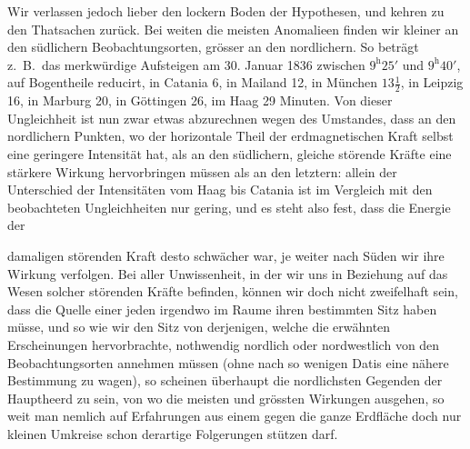 Wir verlassen jedoch lieber den lockern Boden der Hypothesen, und kehren zu den Thatsachen zurück. Bei weiten die meisten Anomalieen finden wir kleiner an den südlichern Beobachtungsorten, grösser an den nordlichern. So beträgt z.\ B.\ das merkwürdige Aufsteigen am 30. Januar 1836 zwischen $9^{\mathrm h}25'$ und $9^{\mathrm h}40'$, auf Bogentheile reducirt, in Catania 6, in Mailand 12, in München $13\frac12$, in Leipzig 16, in Marburg 20, in Göttingen 26, im Haag 29 Minuten. Von dieser Ungleichheit ist nun zwar etwas abzurechnen wegen des Umstandes, dass an den nordlichern Punkten, wo der horizontale Theil der erdmagnetischen Kraft selbst eine geringere Intensität hat, als an den südlichern, gleiche störende Kräfte eine stärkere Wirkung hervorbringen müssen als an den letztern: allein der Unterschied der Intensitäten vom Haag bis Catania ist im Vergleich mit den beobachteten Ungleichheiten nur gering, und es steht also fest, dass die Energie der
\par
\clearpage
{}
\noindent damaligen störenden Kraft desto schwächer war, je weiter nach Süden wir ihre Wirkung verfolgen. Bei aller Unwissenheit, in der wir uns in Beziehung auf das Wesen solcher störenden Kräfte befinden, können wir doch nicht zweifelhaft sein, dass die Quelle einer jeden irgendwo im Raume ihren bestimmten Sitz haben müsse, und so wie wir den Sitz von derjenigen, welche die erwähnten Erscheinungen hervorbrachte, nothwendig nordlich oder nordwestlich von den Beobachtungsorten annehmen müssen (ohne nach so wenigen Datis eine nähere Bestimmung zu wagen), so scheinen überhaupt die nordlichsten Gegenden der Hauptheerd zu sein, von wo die meisten und grössten Wirkungen ausgehen, so weit man nemlich auf Erfahrungen aus einem gegen die ganze Erdfläche doch nur kleinen Umkreise schon derartige Folgerungen stützen darf.

